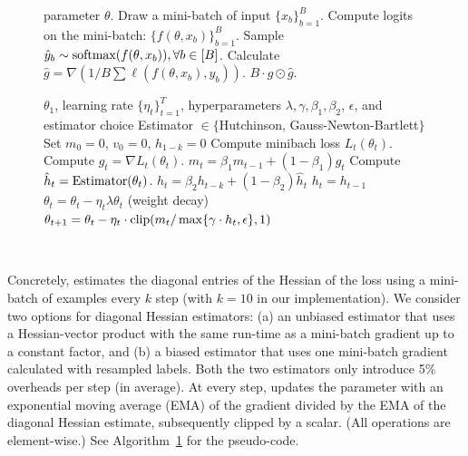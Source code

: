 \begin{figure}
\begin{minipage}[b]{.46\textwidth}
\end{minipage}\hfill
\begin{minipage}[b]{.49\textwidth}
\begin{minipage}[b]{\textwidth}
\begin{algorithm}[H]
	\caption{ $\textup{Gauss-Newton-Bartlett}(\theta)$}
	\label{alg:sub_gn}
	\begin{algorithmic}[1]
		 parameter $\theta$.
		\STATE Draw a mini-batch of input $\{x_b\}_{b=1}^{B}$.
            \STATE Compute logits on the mini-batch: $\{f(\theta, x_b)\}_{b=1}^{B}$.
            \STATE Sample $\hat{y}_b\sim \textup{softmax}(f(\theta, x_b)), \forall b\in [B]$.
            \STATE Calculate $\hat{g} = \nabla(1/B\sum\ell(f(\theta, x_b),\hat{y}_b))$.
        \RETURN $B\cdot \hat{g} \odot \hat{g}$.
	\end{algorithmic}
\end{algorithm}
\end{minipage}
\begin{minipage}[b]{\textwidth}
\begin{algorithm}[H]
	\caption{\ours~}
	\label{alg:hess_opt}
	\begin{algorithmic}[1]
		 $\theta_1$, learning rate $\{\eta_t\}_{t=1}^T$,  hyperparameters $\lambda,\gamma, \beta_{1},\beta_{2}$, $\epsilon$, and estimator choice Estimator $\in\{$Hutchinson, Gauss-Newton-Bartlett$\}$\STATE Set $m_{0} = 0$, $v_{0} = 0$, $h_{1-k} = 0$
		\STATE Compute minibach loss $L_t(\theta_t)$.
        \STATE Compute $g_t = \nabla L_t(\theta_t)$.
		\STATE  $m_{t} = \beta_{1} m_{t-1} + (1 - \beta_{1}) g_{t}$ 
        \STATE Compute $\hat{h}_{t} = \textup{Estimator}(\theta_t)$.
		\STATE  $h_t = \beta_2 h_{t-k} + (1 - \beta_2) \hat{h}_{t}$
        \ELSE \STATE  $h_t = h_{t-1}$
        \ENDIF
        \STATE $\theta_t = \theta_t - \eta_t\lambda \theta_t$ (weight decay)
		\STATE $\theta_{t+1} = \theta_{t} - \eta_t \cdot \textup{clip}(m_t / \max\{\gamma \cdot h_t,\epsilon\},1)$
		\ENDFOR
	\end{algorithmic}
\end{algorithm}
\end{minipage}
\end{minipage}
\end{figure}


Concretely, {\ours} estimates the diagonal entries of the Hessian of the loss using a mini-batch of examples every $k$ step (with $k = 10$ in our implementation). 
We consider two options for diagonal Hessian estimators: (a) an unbiased estimator that uses a Hessian-vector product with the same run-time as a mini-batch gradient up to a constant factor, and (b) a biased estimator that uses one mini-batch gradient calculated with resampled labels. Both the two estimators only introduce 5\% overheads per step (in average).
At every step, {\ours} updates the parameter with an exponential moving average (EMA) of the gradient divided by the EMA of the diagonal Hessian estimate, subsequently clipped by a scalar. (All operations are element-wise.) See Algorithm~\ref{alg:hess_opt} for the pseudo-code.

